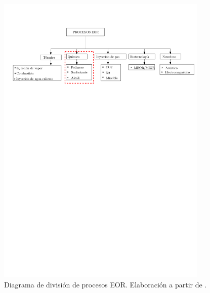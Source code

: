 \begin{figure}
	\centering
	\includegraphics[width=0.9\textwidth]{Fig/diagramaEOR.pdf}
	\caption[Diagrama de división de procesos EOR.]{Diagrama de división de procesos EOR. Elaboración a partir de \cite{gogoi2013carbon}.}
	\label{fig:diagrama_eor}
\end{figure}{}

%
%
%

